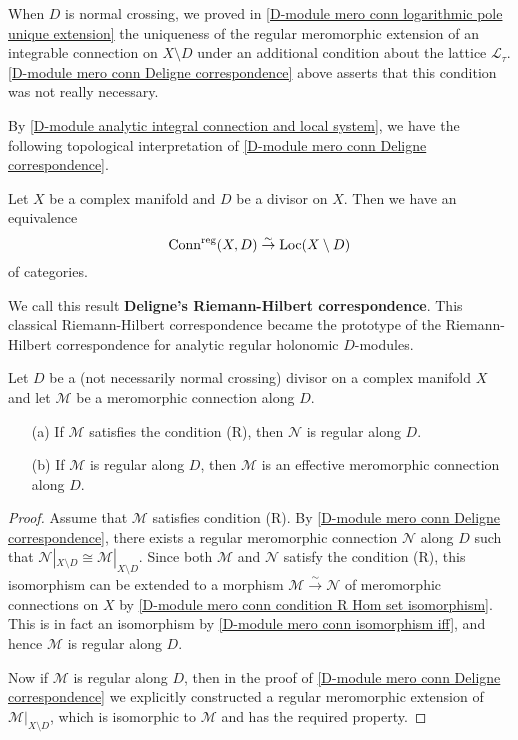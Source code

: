 When $D$ is normal crossing, we proved in \cref{D-module mero conn logarithmic pole unique extension} the uniqueness of the regular meromorphic extension of an integrable connection on $X\setminus D$ under an additional condition about the lattice $\mathscr{L}_\tau$. \cref{D-module mero conn Deligne correspondence} above asserts that this condition was not really necessary.\par
By \cref{D-module analytic integral connection and local system}, we have the following topological interpretation of \cref{D-module mero conn Deligne correspondence}.

\begin{corollary}\label{D-module regular mero conn and local system}
Let $X$ be a complex manifold and $D$ be a divisor on $X$. Then we have an equivalence
\[\mathrm{Conn}^{\mathrm{reg}}(X,D)\stackrel{\sim}{\to} \mathrm{Loc}(X\setminus D)\]
of categories.
\end{corollary}
We call this result \textbf{Deligne's Riemann-Hilbert correspondence}. This classical Riemann-Hilbert correspondence became the prototype of the Riemann-Hilbert correspondence for analytic regular holonomic $D$-modules.

\begin{corollary}\label{D-module mero conn condition R is regular}
Let $D$ be a (not necessarily normal crossing) divisor on a complex manifold $X$ and let $\mathscr{M}$ be a meromorphic connection along $D$.
\begin{enumerate}
    \item[(a)] If $\mathscr{M}$ satisfies the condition (R), then $\mathscr{N}$ is regular along $D$.
    \item[(b)] If $\mathscr{M}$ is regular along $D$, then $\mathscr{M}$ is an effective meromorphic connection along $D$.
\end{enumerate}
\end{corollary}
\begin{proof}
Assume that $\mathscr{M}$ satisfies condition (R). By \cref{D-module mero conn Deligne correspondence}, there exists a regular meromorphic connection $\mathscr{N}$ along $D$ such that $\mathscr{N}|_{X\setminus D}\cong\mathscr{M}|_{X\setminus D}$. Since both $\mathscr{M}$ and $\mathscr{N}$ satisfy the condition (R), this isomorphism can be extended to a morphism $\mathscr{M}\stackrel{\sim}{\to}\mathscr{N}$ of meromorphic connections on $X$ by \cref{D-module mero conn condition R Hom set isomorphism}. This is in fact an isomorphism by \cref{D-module mero conn isomorphism iff}, and hence $\mathscr{M}$ is regular along $D$.\par
Now if $\mathscr{M}$ is regular along $D$, then in the proof of \cref{D-module mero conn Deligne correspondence} we explicitly constructed a regular meromorphic extension of $\mathscr{M}|_{X\setminus D}$, which is isomorphic to $\mathscr{M}$ and has the required property.
\end{proof}

